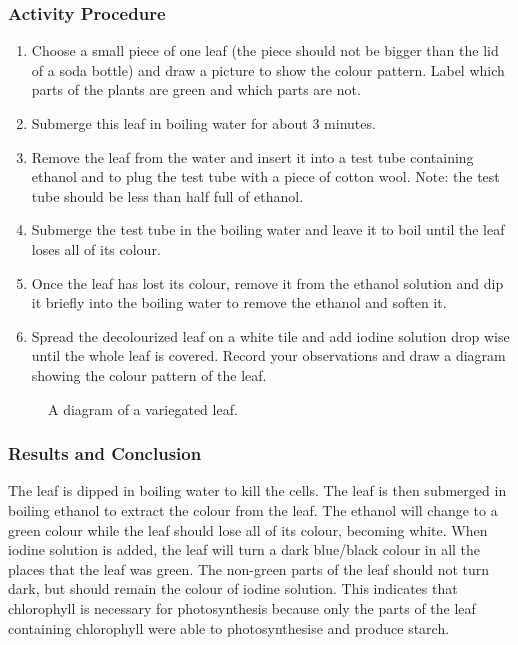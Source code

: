 \subsubsection*{Activity Procedure}
\begin{enumerate}
\item{Choose a small piece of one leaf (the piece should not be bigger than the lid of a soda bottle) and draw a picture to show the colour pattern. Label which parts of the plants are green and which parts are not.}
\item{Submerge this leaf in boiling water for about 3 minutes.}
\item{Remove the leaf from the water and insert it into a test tube containing ethanol and to plug the test tube with a piece of cotton wool. Note: the test tube should be less than half full of ethanol.}
\item{Submerge the test tube in the boiling water and leave it to boil until the leaf loses all of its colour.}
\item{Once the leaf has lost its colour, remove it from the ethanol solution and dip it briefly into the boiling water to remove the ethanol and soften it.}
\item{Spread the decolourized leaf on a white tile and add iodine solution drop wise until the whole leaf is covered. Record your observations and draw a diagram showing the colour pattern of the leaf.}
\end{enumerate}

\begin{figure}[h]
\begin{center}
\def\svgwidth{6cm}

\caption{A diagram of a variegated leaf.}
\label{fig:variegate leaf}
\end{center}
\end{figure}

\subsubsection*{Results and Conclusion}
The leaf is dipped in boiling water to kill the cells. The leaf is then submerged in boiling ethanol to extract the colour from the leaf. The ethanol will change to a green colour while the leaf should lose all of its colour, becoming white. When iodine solution is added, the leaf will turn a dark blue/black colour in all the places that the leaf was green. The non-green parts of the leaf should not turn dark, but should remain the colour of iodine solution. This indicates that chlorophyll is necessary for photosynthesis because only the parts of the leaf containing chlorophyll were able to photosynthesise and produce starch.

